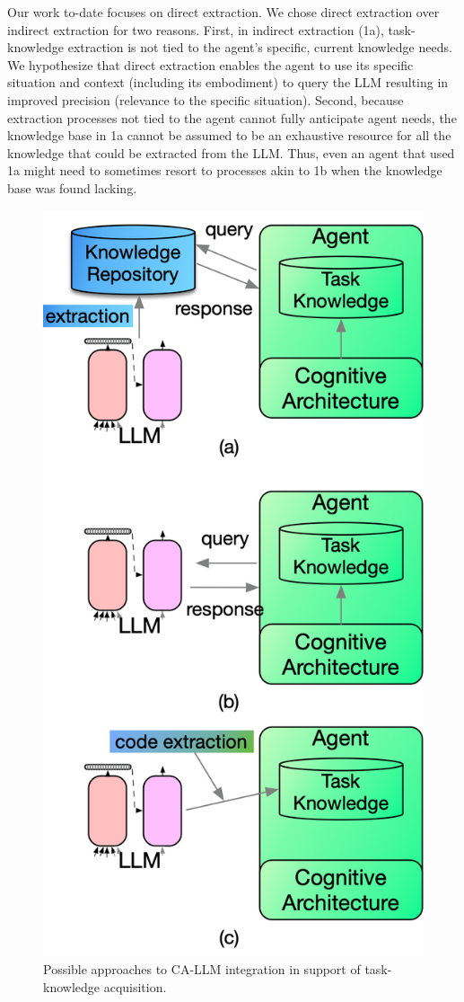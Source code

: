 \documentclass[letterpaper]{article} %
\begin{document}
Our work to-date focuses on direct extraction. We chose direct extraction over indirect extraction for two reasons. First, in indirect extraction (1a), task-knowledge extraction is not tied to the agent's specific, current knowledge needs. We hypothesize that direct extraction enables the agent to use its specific situation and context (including its embodiment) to query the LLM resulting in improved precision (relevance to the specific situation). Second, because extraction processes not tied to the agent cannot fully anticipate agent needs, the knowledge base in 1a cannot be assumed to be an exhaustive resource for all the knowledge that could be extracted from the LLM. Thus, even an agent that used 1a might need to sometimes resort to processes akin to 1b when the knowledge base was found lacking.

\begin{figure}[t]
\centering
\includegraphics[width=.9\columnwidth]{figures/IntegrationOptions.png}
\caption{Possible approaches to CA-LLM integration in support of task-knowledge acquisition.}
\label{fig:integration-patterns}
\end{figure}
\end{document}
